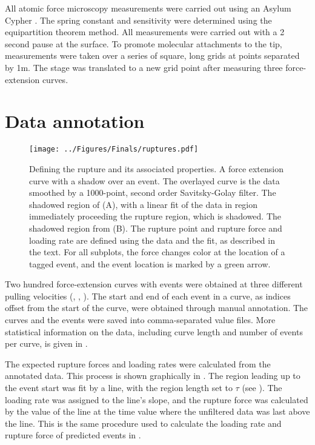 All atomic force microscopy measurements were carried out using an Asylum Cypher . The spring constant and sensitivity were determined using the equipartition theorem method. All measurements were carried out with a 2 second pause at the surface. To promote molecular attachments to the tip, measurements were taken over a series of square,  long grids at points separated by 1\textmu{}m. The stage was translated to a new grid point after measuring three force-extension curves. 

\section{Data annotation}


\begin{figure}[htpb]
\caption[Definition of rupture force and loading rate]{ Defining the rupture and its associated properties.  A force extension curve with a shadow over an event. The overlayed curve is the data smoothed by a 1000-point, second order Savitsky-Golay filter.  The shadowed region of (A), with a linear fit of the data in region immediately proceeding the rupture region, which is shadowed.  The shadowed region from (B). The rupture point and rupture force and loading rate are defined using the data and the fit, as described in the text. For all subplots, the force changes color at the location of a tagged event, and the event location is marked by a green arrow. }
\centering
\texttt{[image: ../Figures/Finals/ruptures.pdf]}%
\end{figure}

Two hundred force-extension curves with events were obtained at three different pulling velocities (, , ). The start and end of each event in a curve, as indices offset from the start of the curve, were obtained through manual annotation. The curves and the events were saved into comma-separated value files. More statistical information on the data, including curve length and number of events per curve, is given in .

The expected rupture forces and loading rates were calculated from the annotated data. This process is shown graphically in . The region leading up to the event start was fit by a line, with the region length set to $\tau$ (see ). The loading rate was assigned to the line's slope, and the rupture force was calculated by the value of the line at the time value where the unfiltered data was last above the line. This is the same procedure used to calculate the loading rate and rupture force of predicted events in . 



